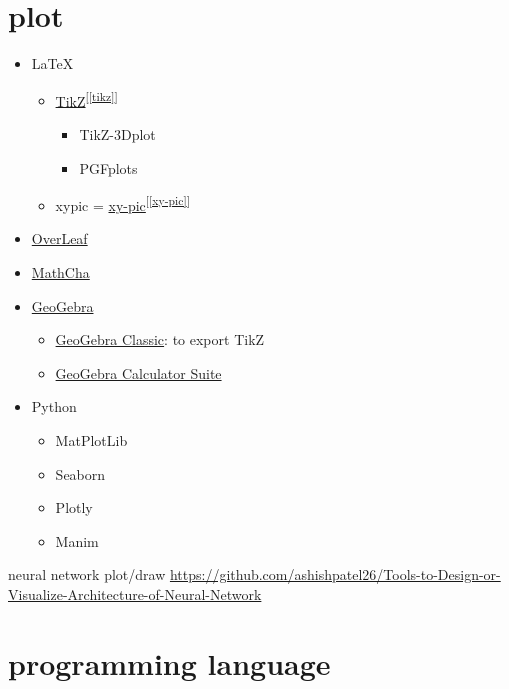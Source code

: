 \documentclass[
]{book}
\providecommand{\tightlist}{%
  \setlength{\itemsep}{0pt}\setlength{\parskip}{0pt}}
\theoremstyle{definition}
\theoremstyle{definition}
\theoremstyle{definition}
\theoremstyle{definition}
\theoremstyle{remark}
\begin{document}
\hypertarget{plot}{%
\chapter{plot}\label{plot}}

\begin{itemize}
\tightlist
\item
  LaTeX

  \begin{itemize}
  \tightlist
  \item
    \protect\hyperlink{tikz}{TikZ}\textsuperscript{{[}\ref{tikz}{]}}

    \begin{itemize}
    \tightlist
    \item
      TikZ-3Dplot
    \item
      PGFplots
    \end{itemize}
  \item
    xypic = \protect\hyperlink{xy-pic}{xy-pic}\textsuperscript{{[}\ref{xy-pic}{]}}
  \end{itemize}
\item
  \href{https://www.overleaf.com/}{OverLeaf}
\item
  \href{https://www.mathcha.io/}{MathCha}
\item
  \href{https://www.geogebra.org/}{GeoGebra}

  \begin{itemize}
  \tightlist
  \item
    \href{https://www.geogebra.org/classic}{GeoGebra Classic}: to export TikZ
  \item
    \href{https://www.geogebra.org/calculator}{GeoGebra Calculator Suite}
  \end{itemize}
\item
  Python

  \begin{itemize}
  \tightlist
  \item
    MatPlotLib
  \item
    Seaborn
  \item
    Plotly
  \item
    Manim
  \end{itemize}
\end{itemize}

neural network plot/draw
\url{https://github.com/ashishpatel26/Tools-to-Design-or-Visualize-Architecture-of-Neural-Network}

\hypertarget{programming-language}{%
\chapter{programming language}\label{programming-language}}
\end{document}
